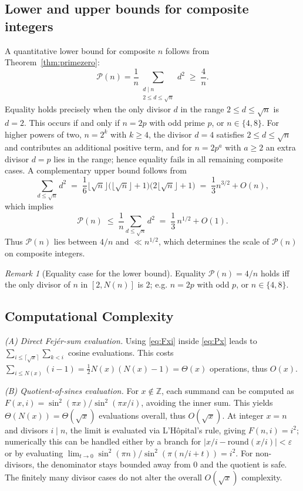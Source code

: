 \documentclass[11pt,a4paper]{amsart}
\theoremstyle{plain}
\theoremstyle{definition}
\theoremstyle{remark}
\newtheorem{remark}[theorem]{Remark}
\begin{document}
\subsection{Lower and upper bounds for composite integers}
A quantitative lower bound for composite $n$ follows from Theorem~\ref{thm:primezero}:
\[
\mathcal{P}(n) = \frac{1}{n} \sum_{\substack{d\mid n \\ 2 \le d \le \sqrt{n}}} d^2 \;\ge\; \frac{4}{n}.
\]
Equality holds precisely when the only divisor $d$ in the range $2\le d\le \sqrt{n}$ is $d=2$. This occurs if and only if $n=2p$ with odd prime $p$, or $n\in\{4,8\}$. For higher powers of two, $n=2^k$ with $k\ge 4$, the divisor $d=4$ satisfies $2\le d\le\sqrt{n}$ and contributes an additional positive term, and for $n=2p^a$ with $a\ge 2$ an extra divisor $d=p$ lies in the range; hence equality fails in all remaining composite cases. A complementary upper bound follows from
\[
\sum_{d\le \sqrt{n}} d^2 \;=\; \frac{1}{6}\bigl\lfloor\sqrt{n}\bigr\rfloor\bigl(\bigl\lfloor\sqrt{n}\bigr\rfloor+1\bigr)\bigl(2\bigl\lfloor\sqrt{n}\bigr\rfloor+1\bigr)
\;=\; \frac{1}{3}n^{3/2} + O(n),
\]
which implies
\[
\mathcal{P}(n) \;\le\; \frac{1}{n}\sum_{d\le \sqrt{n}} d^2
\;=\; \frac{1}{3}\,n^{1/2} + O(1).
\]
Thus $\mathcal{P}(n)$ lies between $4/n$ and $\ll n^{1/2}$, which determines the scale of $\mathcal{P}(n)$ on composite integers.

\begin{remark}[Equality case for the lower bound]
Equality $\mathcal{P}(n)=4/n$ holds iff the only divisor of $n$ in $[2,N(n)]$ is $2$; e.g. $n=2p$ with odd $p$, or $n\in\{4,8\}$.
\end{remark}

\subsection{Computational Complexity}

\smallskip
\noindent\textit{(A) Direct Fejér-sum evaluation.}
Using \eqref{eq:Fxi} inside \eqref{eq:Px} leads to $\sum_{i\le \lceil\sqrt{x}\rceil}\sum_{k<i}$ cosine evaluations.
This costs $\sum_{i\le N(x)}(i-1)=\tfrac12N(x)(N(x)-1)=\Theta(x)$ operations, thus $O(x)$.

\smallskip
\noindent\textit{(B) Quotient-of-sines evaluation.}
For $x\notin\mathbb{Z}$, each summand can be computed as $F(x,i)=\sin^2(\pi x)/\sin^2(\pi x/i)$, avoiding the inner sum.
This yields $\Theta(N(x))=\Theta(\sqrt{x})$ evaluations overall, thus $O(\sqrt{x})$.
At integer $x=n$ and divisors $i\mid n$, the limit is evaluated via L’Hôpital’s rule, giving $F(n,i)=i^2$; numerically this can be handled either by a branch for $|x/i-\mathrm{round}(x/i)|<\varepsilon$ or by evaluating $\lim_{t\to0}\sin^2(\pi n)/\sin^2(\pi(n/i+t))=i^2$.
For non-divisors, the denominator stays bounded away from $0$ and the quotient is safe.
The finitely many divisor cases do not alter the overall $O(\sqrt{x})$ complexity.
\end{document}
